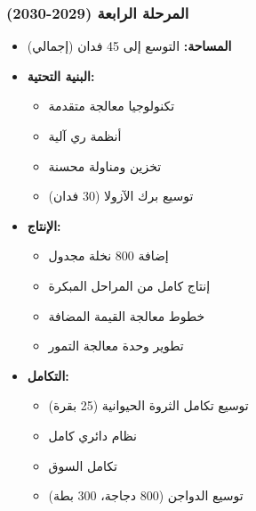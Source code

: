 \subsubsection{المرحلة الرابعة (2029-2030)}
\begin{itemize}
    \item \textbf{المساحة:} التوسع إلى 45 فدان (إجمالي)
    \item \textbf{البنية التحتية:}
    \begin{itemize}
        \item تكنولوجيا معالجة متقدمة
        \item أنظمة ري آلية
        \item تخزين ومناولة محسنة
        \item توسيع برك الآزولا (30 فدان)
    \end{itemize}
    \item \textbf{الإنتاج:}
    \begin{itemize}
        \item إضافة 800 نخلة مجدول
        \item إنتاج كامل من المراحل المبكرة
        \item خطوط معالجة القيمة المضافة
        \item تطوير وحدة معالجة التمور
    \end{itemize}
    \item \textbf{التكامل:}
    \begin{itemize}
        \item توسيع تكامل الثروة الحيوانية (25 بقرة)
        \item نظام دائري كامل
        \item تكامل السوق
        \item توسيع الدواجن (800 دجاجة، 300 بطة)
    \end{itemize}
\end{itemize}

